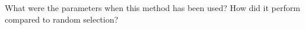 \documentclass[thesis=B,english]{FITthesis}[2012/10/20]
\begin{document}
What were the parameters when this method has been used?
How did it perform compared to random selection?

%
%
%
%
%
%
%
%
\end{document}
